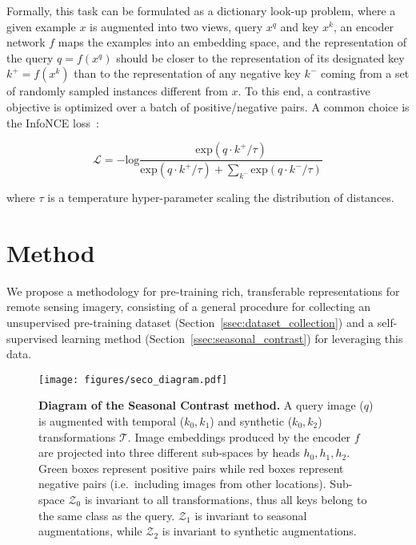 \documentclass[10pt,twocolumn,letterpaper]{article}
\begin{document}
Formally, this task can be formulated as a dictionary look-up problem, where a given example $x$ is augmented into two views, query $x^q$ and key $x^k$, an encoder network $f$ maps the examples into an embedding space, and the representation of the query $q = f(x^q)$ should be closer to the representation of its designated key $k^+ = f(x^k)$ than to the representation of any negative key $k^-$ coming from a set of randomly sampled instances different from $x$. To this end, a contrastive objective is optimized over a batch of positive/negative pairs. A common choice is the InfoNCE loss~\cite{oord2018representation}:

\begin{equation}\label{eq:infonce_loss}
    \mathcal{L} = -\mathrm{log} \frac{\mathrm{exp} (q \cdot k^+ / \tau)}{\mathrm{exp} (q \cdot k^+ / \tau) + \sum_{k^-} \mathrm{exp} (q \cdot k^- / \tau)}
\end{equation}

where $\tau$ is a temperature hyper-parameter scaling the distribution of distances.



\section{Method}
We propose a methodology for pre-training rich, transferable representations for remote sensing imagery, consisting of a general procedure for collecting an unsupervised pre-training dataset (Section~\ref{ssec:dataset_collection}) and a self-supervised learning method (Section~\ref{ssec:seasonal_contrast}) for leveraging this data.

\begin{figure*}[t]
    \begin{center}
    \texttt{[image: figures/seco\_diagram.pdf]}
    \end{center}
    \caption{\textbf{Diagram of the Seasonal Contrast method.} A query image ($q$) is augmented with temporal ($k_{0},k_{1}$) and synthetic ($k_{0},k_2$) transformations $\mathcal{T}$. Image embeddings produced by the encoder $f$ are projected into three different sub-spaces by heads $h_0,h_1,h_2$. Green boxes represent positive pairs while red boxes represent negative pairs (i.e.\ including images from other locations). Sub-space $\mathcal{Z}_0$ is invariant to all transformations, thus all keys belong to the same class as the query. $\mathcal{Z}_1$ is invariant to seasonal augmentations, while $\mathcal{Z}_2$ is invariant to synthetic augmentations.}
    \label{fig:diagram}
\end{figure*}
\end{document}
